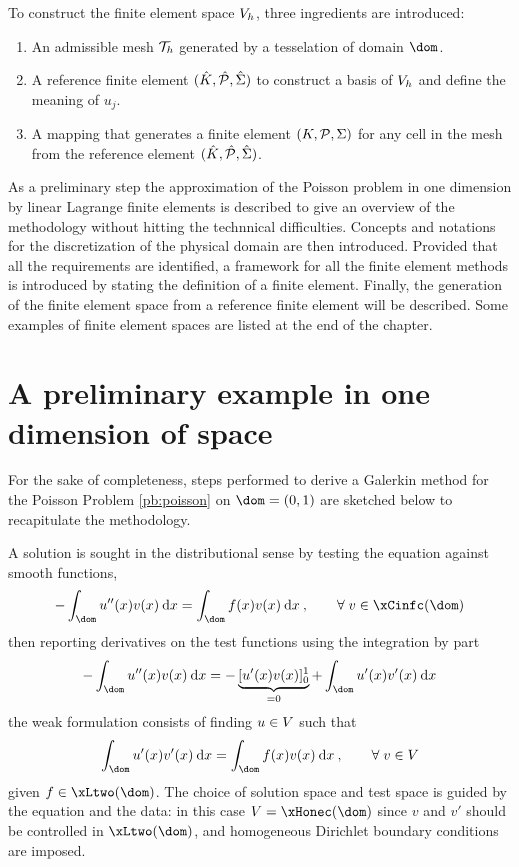 \medskip
To construct the finite element space ${{V}}_h$, three ingredients are introduced:
\begin{enumerate}
\item An admissible mesh ${\mathcal T}_h$ generated by a tesselation of domain $\dom$.
\item A reference finite element ${({\hat {{K}}},{\hat {{\mathcal P}}}, {\hat{{\Sigma}}})}$ to construct a basis of ${{V}}_h$ and define the meaning of $u_j$.
\item A mapping that generates a finite element ${({K},{\mathcal P}, {\Sigma})}$ for any cell in the mesh from the reference element ${({\hat {{K}}},{\hat {{\mathcal P}}}, {\hat{{\Sigma}}})}$.
\end{enumerate}

\medskip
As a preliminary step the approximation of the Poisson problem in one dimension by linear Lagrange finite elements is described to give an overview of the methodology without hitting the technnical difficulties.
Concepts and notations for the discretization of the physical domain are then introduced.
Provided that all the requirements are identified, a framework for all the finite element methods is introduced by stating the definition of a finite element.
Finally, the generation of the finite element space from a reference finite element will be described.
Some examples of finite element spaces are listed at the end of the chapter.

\section{A preliminary example in one dimension of space}

For the sake of completeness, steps performed to derive a Galerkin method for the Poisson Problem \ref{pb:poisson} on $\dom = (0, 1)$ are sketched below to recapitulate the methodology.

\medskip
A solution is sought in the distributional sense by testing the equation against smooth functions,
\begin{equation*}
- \int_\dom u''(x) v(x) \md x = \int_\dom f(x) v(x) \md x\:,\qquad\forany v \in \xCinfc(\dom)
\end{equation*}
then reporting derivatives on the test functions using the integration by part
\begin{equation*}
- \int_\dom u''(x) v(x) \md x = - \underbrace{[u'(x)v(x)]_0^1}_{= 0} + \int_\dom u'(x) v'(x) \md x
\end{equation*}
the weak formulation consists of finding $u\in{V}$ such that
\begin{equation*}
\int_\dom u'(x) v'(x) \md x = \int_\dom f(x) v(x) \md x\:,\qquad\forany v \in \xV
\end{equation*}
given $f \in \xLtwo(\dom)$.
The choice of solution space and test space is guided by the equation and the data: in this case $\xV = \xHonec(\dom)$ since $v$ and $v'$ should be controlled in $\xLtwo(\dom)$, and homogeneous Dirichlet boundary conditions are imposed.

